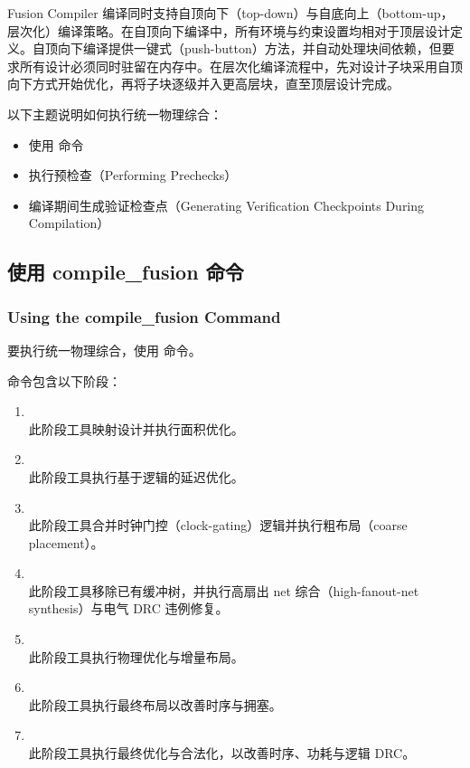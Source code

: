 Fusion Compiler 编译同时支持自顶向下（top-down）与自底向上（bottom-up，层次化）编译策略。在自顶向下编译中，所有环境与约束设置均相对于顶层设计定义。自顶向下编译提供一键式（push-button）方法，并自动处理块间依赖，但要求所有设计必须同时驻留在内存中。在层次化编译流程中，先对设计子块采用自顶向下方式开始优化，再将子块逐级并入更高层块，直至顶层设计完成。

以下主题说明如何执行统一物理综合：
\begin{itemize}
  \item 使用  命令
  \item 执行预检查（Performing Prechecks）
  \item 编译期间生成验证检查点（Generating Verification Checkpoints During Compilation）
\end{itemize}

\subsection{使用 compile\_fusion 命令}
\subsubsection*{Using the compile\_fusion Command}

要执行统一物理综合，使用  命令。

 命令包含以下阶段：
\begin{enumerate}
  \item \textbf{}\\
    此阶段工具映射设计并执行面积优化。
  \item \textbf{}\\
    此阶段工具执行基于逻辑的延迟优化。
  \item \textbf{}\\
    此阶段工具合并时钟门控（clock-gating）逻辑并执行粗布局（coarse placement）。
  \item \textbf{}\\
    此阶段工具移除已有缓冲树，并执行高扇出 net 综合（high-fanout-net synthesis）与电气 DRC 违例修复。
  \item \textbf{}\\
    此阶段工具执行物理优化与增量布局。
  \item \textbf{}\\
    此阶段工具执行最终布局以改善时序与拥塞。
  \item \textbf{}\\
    此阶段工具执行最终优化与合法化，以改善时序、功耗与逻辑 DRC。
\end{enumerate}


